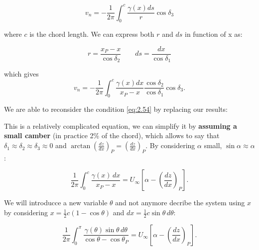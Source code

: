 	\begin{equation}
	v_n = - \frac{1}{2\pi }\int _0 ^c \frac{\gamma (x) ds}{r} \cos \delta _3
	\end{equation}
	
	where $c$ is the chord length. We can express both $r$ and $ds$ in function of x as: 
	
	\begin{equation}
	r = \frac{x_P - x}{\cos \delta _2} \qquad ds = \frac{dx}{\cos \delta _1}
	\end{equation}
	
	which gives 
	\begin{equation}
	v_n = - \frac{1}{2\pi }\int _0 ^c \frac{\gamma (x) dx}{x_P - x} \frac{\cos \delta _2}{\cos \delta _1}\cos \delta _3. 
	\end{equation}
	
	We are able to reconsider the condition \eqref{eq:2.54} by replacing our results: 
	
	\begin{center}
	\end{center}
	
	This is a relatively complicated equation, we can simplify it by \textbf{assuming a small camber} (in practice 2\% of the chord), which allows to say that $\delta _1 \approx \delta _2 \approx \delta _3 \approx 0$ and $\arctan \left( \frac{dz}{dx}\right) _P = \left( \frac{dz}{dx}\right) _P$. By considering $\alpha$ small, $\sin \alpha \approx \alpha$:
	
	\begin{equation}
	\frac{1}{2\pi} \int _0 ^c \frac{\gamma (x)\, dx}{x_P - x} = U_{\infty}\left[ \alpha -  \left(\frac{dz}{dx} \right)_P \right].
	\end{equation}
	
	We will introducce a new variable $\theta$ and not anymore decribe the system using $x$ by considering $x = \frac{1}{2}c (1-\cos \theta)$ and $dx = \frac{1}{2}c \sin \theta\, d\theta$: 
	
	\begin{equation}
	\frac{1}{2\pi} \int _0 ^{\pi} \frac{\gamma (\theta)\sin \theta \, d\theta}{\cos \theta - \cos \theta _P} = U_{\infty}\left[ \alpha -  \left(\frac{dz}{dx} \right)_P \right].
	\label{eq:2.61}
	\end{equation}
	
